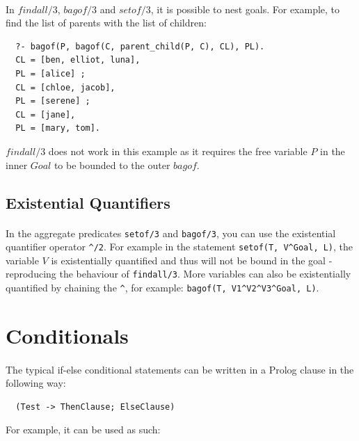 \documentclass{article}
\begin{document}
\begin{multicols}{2}
  \paragraph{} In $findall/3$, $bagof/3$ and $setof/3$, it is possible to nest goals. For example, to find the list of parents with the list of children:
  
  \begin{lstlisting}
  ?- bagof(P, bagof(C, parent_child(P, C), CL), PL).
  CL = [ben, elliot, luna],
  PL = [alice] ;
  CL = [chloe, jacob],
  PL = [serene] ;
  CL = [jane],
  PL = [mary, tom].
  \end{lstlisting}
  
  $findall/3$ does not work in this example as it requires the free variable $P$ in the inner $Goal$ to  be bounded to the outer $bagof$.
  
  \subsection{Existential Quantifiers}
  
  \paragraph{} In the aggregate predicates \lstinline{setof/3} and \lstinline{bagof/3}, you can use the existential quantifier operator \lstinline{^/2}. For example in the statement \lstinline{setof(T, V^Goal, L)}, the variable $V$ is existentially quantified and thus will not be bound in the goal - reproducing the behaviour of \lstinline{findall/3}. More variables can also be existentially quantified by chaining the \lstinline{^}, for example: \lstinline{bagof(T, V1^V2^V3^Goal, L)}.
  
  \section{Conditionals}
  
  \paragraph{} The typical if-else conditional statements can be written in a Prolog clause in the following way:
  
  \begin{lstlisting}
  (Test -> ThenClause; ElseClause)
  \end{lstlisting}
  
  \noindent For example, it can be used as such:
  

\end{multicols}
\end{document}
